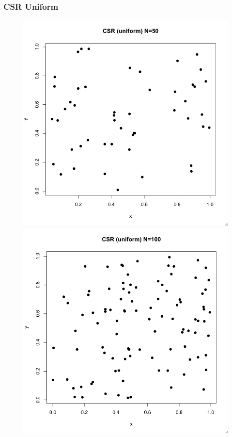 \documentclass[nototal,handout]{beamer}
\begin{document}
\begin{frame}
	\frametitle{CSR Uniform}
 \begin{figure}[ht]
  \begin{minipage}[b]{0.4\linewidth}
  \centering
  \includegraphics[scale=0.20]{csru50.png}
  \end{minipage}
  \begin{minipage}[b]{0.4\linewidth}
  \centering
  \includegraphics[scale=0.20]{csru100.png}
  \end{minipage}

  \end{figure}
 \end{frame} 
\end{document}

